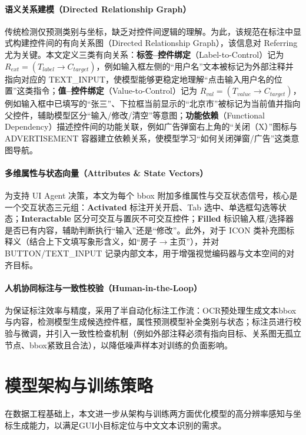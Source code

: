 \paragraph{语义关系建模（Directed Relationship Graph）}
传统检测仅预测类别与坐标，缺乏对控件间逻辑的理解。为此，该规范在标注中显式构建控件间的有向关系图（Directed Relationship Graph），该信息对 Referring 尤为关键。本文定义三类有向关系：\textbf{标签--控件绑定}（Label-to-Control）记为 $R_{ext}=(T_{label}\rightarrow C_{target})$，例如输入框左侧的“用户名”文本被标记为外部注释并指向对应的 \allowbreak TEXT\_INPUT，使模型能够更稳定地理解“点击输入用户名的位置”这类指令；\textbf{值--控件绑定}（Value-to-Control）记为 $R_{val}=(T_{value}\rightarrow C_{target})$，例如输入框中已填写的“张三”、下拉框当前显示的“北京市”被标记为当前值并指向父控件，辅助模型区分“输入/修改/清空”等意图；\textbf{功能依赖}（Functional Dependency）描述控件间的功能关联，例如广告弹窗右上角的“关闭（X）”图标与 ADVERTISEMENT 容器建立依赖关系，使模型学习“如何关闭弹窗/广告”这类意图导航。

\paragraph{多维属性与状态向量（Attributes \& State Vectors）}
为支持 UI Agent 决策，本文为每个 bbox 附加多维属性与交互状态信号，核心是一个交互状态三元组：\textbf{Activated} 标注开关开启、Tab 选中、单选框勾选等状态；\textbf{Interactable} 区分可交互与置灰不可交互控件；\textbf{Filled} 标识输入框/选择器是否已有内容，辅助判断执行“输入”还是“修改”。此外，对于 ICON 类补充图标释义（结合上下文填写象形含义，如“房子$\rightarrow$主页”），并对 BUTTON/TEXT\_INPUT 记录内部文本，用于增强视觉编码器与文本空间的对齐目标。

\paragraph{人机协同标注与一致性校验（Human-in-the-Loop）}
为保证标注效率与精度，采用了半自动化标注工作流：OCR预处理生成文本bbox与内容，检测模型生成候选控件框，属性预测模型补全类别与状态；标注员进行校验与微调，并引入一致性检查机制（例如外部注释必须有指向目标、关系图无孤立节点、bbox紧致且合法），以降低噪声样本对训练的负面影响。

\section{模型架构与训练策略}
在数据工程基础上，本文进一步从架构与训练两方面优化模型的高分辨率感知与坐标生成能力，以满足GUI小目标定位与中文文本识别的需求。

